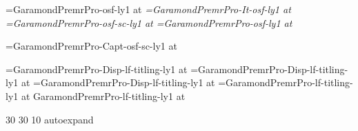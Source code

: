%
%


\def\romantext{GaramondPremrPro-osf-ly1 }
\def\italictext{GaramondPremrPro-It-osf-ly1 }
\def\smallcaptext{GaramondPremrPro-osf-sc-ly1 }
\def\titlingtext{GaramondPremrPro-lf-titling-ly1 }
\def\smallcapcaption{GaramondPremrPro-Capt-osf-sc-ly1 }
\def\titlingdisplay{GaramondPremrPro-Disp-lf-titling-ly1 }
\def\proximatitling{ProximaNova-Regular-lf-titling-ly1 }

\newdimen\textsize \textsize=11pt
\newdimen\smalltextsize \smalltextsize=10pt
\newdimen\headlinesize \headlinesize=8pt
\newdimen\booktitlesize \booktitlesize=30pt
\newdimen\authornamesize \authornamesize=24pt
\newdimen\publishernamesize \publishernamesize=24pt
\newdimen\aheadsize \aheadsize=24pt
\newdimen\bheadsize \bheadsize=14pt

\font\rm=\romantext at \textsize
\font\it=\italictext at \textsize
\font\sc=\smallcaptext at \textsize
\font\fineprint=\romantext at \smalltextsize

\font\headlinefont=\smallcapcaption at \headlinesize

\font\booktitlefont=\titlingdisplay at \booktitlesize
\font\authornamefont=\titlingdisplay at \authornamesize
\font\chaptertitlefont=\titlingdisplay at \aheadsize
\font\scenetitlefont=\titlingtext at \bheadsize
\font\authorinfotitlefont \titlingtext at \smalltextsize

\def\footlinefont{\headlinefont}
\def\bookinfotitlefont{\scenetitlefont}



\newdimen\leading \leading=15pt

\pdffontexpand\rm 30 30 10 autoexpand
